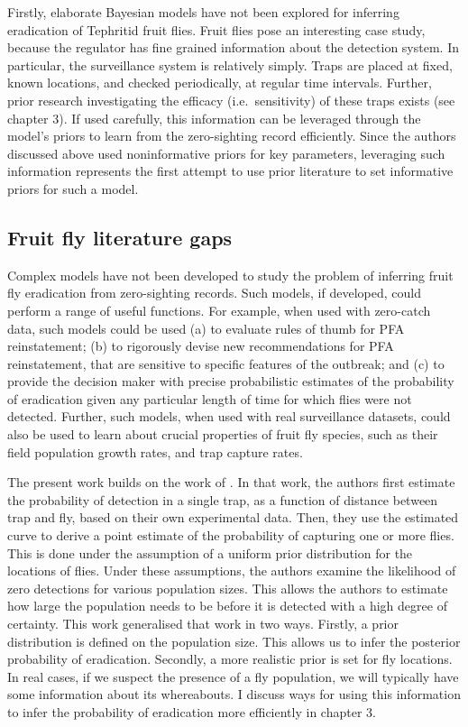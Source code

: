 \documentclass[
  oneside]{book}
\begin{document}
Firstly, elaborate Bayesian models have not been explored for inferring eradication of Tephritid fruit flies. Fruit flies pose an interesting case study, because the regulator has fine grained information about the detection system. In particular, the surveillance system is relatively simply. Traps are placed at fixed, known locations, and checked periodically, at regular time intervals. Further, prior research investigating the efficacy (i.e.~sensitivity) of these traps exists (see chapter 3). If used carefully, this information can be leveraged through the model's priors to learn from the zero-sighting record efficiently. Since the authors discussed above used noninformative priors for key parameters, leveraging such information represents the first attempt to use prior literature to set informative priors for such a model.

\hypertarget{fruit-fly-literature-gaps}{%
\subsection{Fruit fly literature gaps}\label{fruit-fly-literature-gaps}}

Complex models have not been developed to study the problem of inferring fruit fly eradication from zero-sighting records. Such models, if developed, could perform a range of useful functions. For example, when used with zero-catch data, such models could be used (a) to evaluate rules of thumb for PFA reinstatement; (b) to rigorously devise new recommendations for PFA reinstatement, that are sensitive to specific features of the outbreak; and (c) to provide the decision maker with precise probabilistic estimates of the probability of eradication given any particular length of time for which flies were not detected. Further, such models, when used with real surveillance datasets, could also be used to learn about crucial properties of fruit fly species, such as their field population growth rates, and trap capture rates.

The present work builds on the work of \citet{lance1994}. In that work, the authors first estimate the probability of detection in a single trap, as a function of distance between trap and fly, based on their own experimental data. Then, they use the estimated curve to derive a point estimate of the probability of capturing one or more flies. This is done under the assumption of a uniform prior distribution for the locations of flies. Under these assumptions, the authors examine the likelihood of zero detections for various population sizes. This allows the authors to estimate how large the population needs to be before it is detected with a high degree of certainty. This work generalised that work in two ways. Firstly, a prior distribution is defined on the population size. This allows us to infer the posterior probability of eradication. Secondly, a more realistic prior is set for fly locations. In real cases, if we suspect the presence of a fly population, we will typically have some information about its whereabouts. I discuss ways for using this information to infer the probability of eradication more efficiently in chapter 3.
\end{document}
